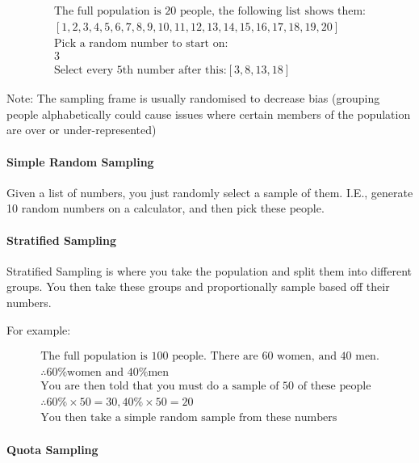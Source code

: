 \documentclass[
]{article}
\begin{document}
\begin{gather*}
  \text{The full population is 20 people, the following list shows them:}
  \\
  [1, 2, 3, 4, 5, 6, 7, 8, 9, 10, 11, 12, 13, 14, 15, 16, 17, 18, 19, 20]
  \\
  \text{Pick a random number to start on:}
  \\
  3
  \\
  \text{Select every 5th number after this:}
  [3, 8, 13, 18]
\end{gather*}

Note: The sampling frame is usually randomised to decrease bias
(grouping people alphabetically could cause issues where certain members
of the population are over or under-represented)

\hypertarget{simple-random-sampling}{%
\paragraph{Simple Random Sampling}\label{simple-random-sampling}}

Given a list of numbers, you just randomly select a sample of them.
I.E., generate 10 random numbers on a calculator, and then pick these
people.

\begin{minipage}{\textwidth}

\hypertarget{stratified-sampling}{%
\paragraph{Stratified Sampling}\label{stratified-sampling}}

Stratified Sampling is where you take the population and split them into
different groups. You then take these groups and proportionally sample
based off their numbers.


For example:

\begin{gather*}
  \text{The full population is 100 people. There are 60 women, and 40 men.}
  \\\therefore 
  \text{60\% women and 40\% men}
  \\
  \text{You are then told that you must do a sample of 50 of these people}
  \\
  \therefore 60\% \times 50 = 30, 40\% \times 50 = 20
  \\
  \text{You then take a simple random sample from these numbers}
\end{gather*}
\end{minipage}
\hypertarget{quota-sampling}{%
\paragraph{Quota Sampling}\label{quota-sampling}}
\end{document}
